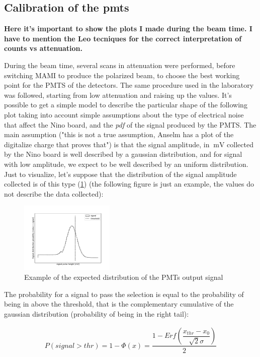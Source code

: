 \subsection{Calibration of the pmts}

{\bfseries Here it's important to show the plots I made during the beam time. I have to mention the Leo tecniques for the correct interpretation of counts vs attenuation.}

During the beam time, several scans in attenuation were performed, before switching MAMI to produce the polarized beam, to choose the best working point for the PMTS of the detectors. The same procedure used in the laboratory was followed, starting from low attenuation and raising up the values. It's possible to get a simple model to describe the particular shape of the following plot taking into account simple assumptions about the type of electrical noise that affect the Nino board, and the \textit{pdf} of the signal produced by the PMTS.
The main assumption ("this is not a true assumption, Anselm has a plot of the digitalize charge that proves that") is that the signal amplitude, in $\SI{}{\milli \volt}$ collected by the Nino board is well described by a gaussian distribution, and for signal with low amplitude, we expect to be well described by an uniform distribution. Just to visualize, let's suppose that the distribution of the signal amplitude collected is of this type (\ref{fig:PDF}) (the following figure is just an example, the values ​​do not describe the data collected):

\begin{figure}[hbtp]
\centering
\includegraphics[width = 0.40\textwidth]{Analysis/distribution.pdf}
\caption{Example of the expected distribution of the PMTs output signal}
\label{fig:PDF}
\end{figure}

The probability for a signal to pass the selection is equal to the probability of being in above the threshold, that is the complementary cumulative of the gaussian distribution (probability of being in the right tail):

\begin{align*}
P(signal > thr) = 1 - \Phi(x) = \dfrac{1 - Erf(\dfrac{x_{thr} - x_{0}}{\sqrt{2} \sigma })}{2}
\end{align*}

